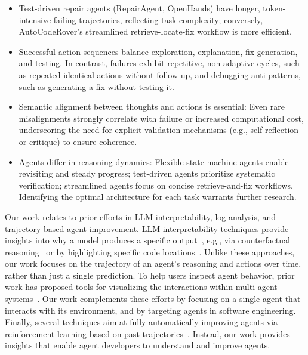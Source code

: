 \documentclass[conference,10pt]{IEEEtran}
\theoremstyle{definition}        %
\newcommand{\ra}{Repair\-Agent}
\newcommand{\oh}{Open\-Hands}
\newcommand{\acr}{Auto\-Code\-Rover}
\begin{document}
\begin{itemize}
	\item Test-driven repair agents (\ra{}, \oh{}) have longer, token-intensive failing trajectories, reflecting task complexity; conversely, \acr{}'s streamlined retrieve-locate-fix workflow is more efficient.
	
	\item Successful action sequences balance exploration, explanation, fix generation, and testing. In contrast, failures exhibit repetitive, non-adaptive cycles, such as repeated identical actions without follow-up, and debugging anti-patterns, such as generating a fix without testing it.
	
	\item Semantic alignment between thoughts and actions is essential: Even rare misalignments strongly correlate with failure or increased computational cost, underscoring the need for explicit validation mechanisms (e.g., self-reflection or critique) to ensure coherence.

	\item Agents differ in reasoning dynamics: Flexible state-machine agents enable revisiting and steady progress; test-driven agents prioritize systematic verification; streamlined agents focus on concise retrieve-and-fix workflows. Identifying the optimal architecture for each task warrants further research.

	
	
	
\end{itemize}

Our work relates to prior efforts in LLM interpretability, log analysis, and trajectory-based agent improvement.
LLM interpretability techniques provide insights into why a model produces a specific output~\cite{Guidotti2019,survey_explain_llm}, e.g., via counterfactual reasoning~\cite{Cito2022} or by highlighting specific code locations~\cite{ying2019gnnexplainer}.
Unlike these approaches, our work focuses on the trajectory of an agent's reasoning and actions over time, rather than just a single prediction.
To help users inspect agent behavior, prior work has proposed tools for visualizing the interactions within multi-agent systems~\cite{lu2024agentlens,Epperson2025}.
Our work complements these efforts by focusing on a single agent that interacts with its environment, and by targeting agents in software engineering.
Finally, several techniques aim at fully automatically improving agents via reinforcement learning based on past trajectories~\cite{Gupta2024,song2024trial,deng2024novice}.
Instead, our work provides insights that enable agent developers to understand and improve agents.
\end{document}
